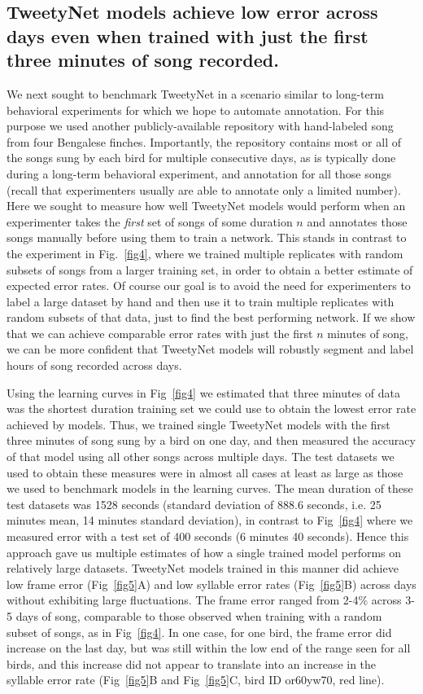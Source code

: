 \documentclass[10pt,letterpaper]{article}
\begin{document}
\subsection*{ TweetyNet models achieve low error across days even when trained with just the first three minutes of song recorded.}
We next sought to benchmark TweetyNet in a scenario similar to long-term behavioral experiments 
for which we hope to automate annotation. 
For this purpose we used another publicly-available repository \cite{nicholson_bengalese_2017} 
with hand-labeled song from four Bengalese finches. 
Importantly, the repository contains most or all of the songs sung 
by each bird for multiple consecutive days, as is typically done 
during a long-term behavioral experiment, 
and annotation for all those songs (recall that experimenters usually are able to annotate only a limited number).
Here we sought to measure how well TweetyNet models 
would perform when an experimenter takes the \textit{first} set of songs of 
some duration $n$ and annotates those songs manually before using them to train a network.
This stands in contrast to the experiment in Fig.~\ref{fig4},
where we trained multiple replicates with random subsets 
of songs from a larger training set, in order to obtain a better estimate of expected error rates.  
Of course our goal is to avoid the need for experimenters to label a large dataset by 
hand and then use it to train multiple replicates with random subsets of that data, 
just to find the best performing network. 
If we show that we can achieve comparable error rates with just the first $n$ minutes of song, we 
can be more confident that TweetyNet models will robustly segment and label hours of song recorded across days.

Using the learning curves in Fig~\ref{fig4} we estimated that three minutes 
of data was the shortest duration training set we could use to obtain 
the lowest error rate achieved by models. 
Thus, we trained single TweetyNet models with the first three minutes of song  
sung by a bird on one day, and then measured the accuracy of 
that model using all other songs across multiple days.
The test datasets we used to obtain these measures were in almost all cases at least as large as 
those we used to benchmark models in the learning curves.
The mean duration of these test datasets was 1528 seconds 
(standard deviation of 888.6 seconds, 
i.e. 25 minutes mean, 14 minutes standard deviation),
in contrast to Fig~\ref{fig4} where we measured error with 
a test set of 400 seconds (6 minutes 40 seconds).
Hence this approach gave us multiple estimates of 
how a single trained model performs on relatively large datasets.
TweetyNet models trained in this manner did achieve low frame error (Fig~\ref{fig5}A) and 
low syllable error rates (Fig~\ref{fig5}B) across days without exhibiting large fluctuations.
The frame error ranged from 2-4\% across 3-5 days of song, 
comparable to those observed when training with a random subset of songs, as in Fig~\ref{fig4}.
In one case, for one bird, the frame error did increase on the last day, but was still 
within the low end of the range seen for all birds, and this increase did not appear to translate into 
an increase in the syllable error rate (Fig~\ref{fig5}B and Fig~\ref{fig5}C, bird ID or60yw70, red line).
\end{document}
